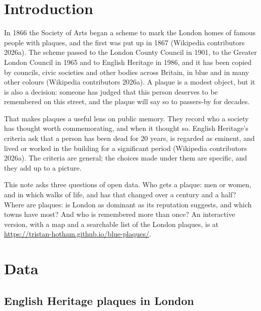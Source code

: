 \documentclass[11pt,a4paper]{article}
\begin{document}
\section{Introduction}

In 1866 the Society of Arts began a scheme to mark the London homes of famous people with plaques, and the first was put up in 1867 (Wikipedia contributors 2026a). The scheme passed to the London County Council in 1901, to the Greater London Council in 1965 and to English Heritage in 1986, and it has been copied by councils, civic societies and other bodies across Britain, in blue and in many other colours (Wikipedia contributors 2026a). A plaque is a modest object, but it is also a decision: someone has judged that this person deserves to be remembered on this street, and the plaque will say so to passers-by for decades.

That makes plaques a useful lens on public memory. They record who a society has thought worth commemorating, and when it thought so. English Heritage's criteria ask that a person has been dead for 20 years, is regarded as eminent, and lived or worked in the building for a significant period (Wikipedia contributors 2026a). The criteria are general; the choices made under them are specific, and they add up to a picture.

This note asks three questions of open data. Who gets a plaque: men or women, and in which walks of life, and has that changed over a century and a half? Where are plaques: is London as dominant as its reputation suggests, and which towns have most? And who is remembered more than once? An interactive version, with a map and a searchable list of the London plaques, is at \url{https://tristan-hotham.github.io/blue-plaques/}.

\section{Data}

\subsection{English Heritage plaques in London}
\end{document}
